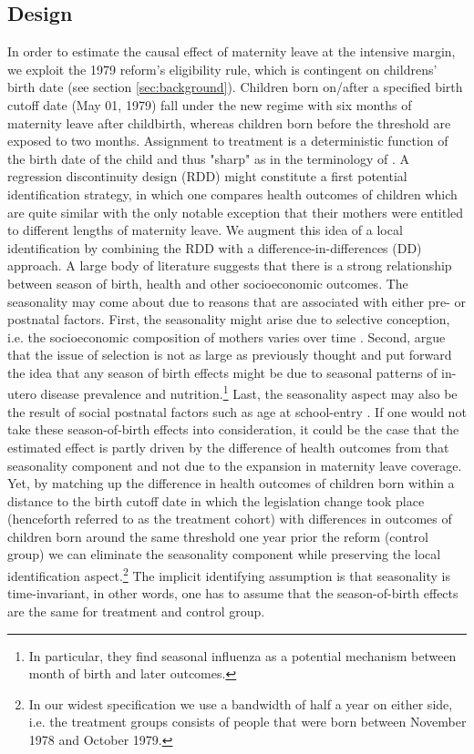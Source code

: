 \documentclass[11pt, a4paper]{article} %
\begin{document}
\subsection{Design}\label{sec:empirical_strategy_1design}
In order to estimate the causal effect of maternity leave at the intensive margin, we exploit the 1979 reform's eligibility rule, which is contingent on childrens' birth date (see section \ref{sec:background}). Children born on/after a specified birth cutoff date (May 01, 1979) fall under the new regime with six months of maternity leave after childbirth, whereas children born before the threshold are exposed to two months. Assignment to treatment is a deterministic function of the birth date of the child and thus "sharp" as in the terminology of \cite{hahn2001identification}. A regression discontinuity design (RDD) might constitute a first potential identification strategy, in which one compares health outcomes of children which are quite similar with the only notable exception that their mothers were entitled to different lengths of maternity leave.\newline 
We augment this idea of a local identification by combining the RDD with a difference-in-differences (DD) approach. A large body of literature suggests that there is a strong relationship between season of birth, health and other socioeconomic outcomes. The seasonality may come about due to reasons that are associated with either pre- or postnatal factors. First, the seasonality might arise due to selective conception, i.e. the socioeconomic composition of mothers varies over time \citep{buckles2013season}. Second, \cite{currie2013within} argue that the issue of selection is not as large as previously thought and put forward the idea that any season of birth effects might be due to seasonal patterns of in-utero disease prevalence and nutrition.\footnote{In particular, they find seasonal influenza as a potential mechanism between month of birth and later outcomes.} Last, the seasonality aspect may also be the result of social postnatal factors such as age at school-entry \citep{black2011too}. \newline If one would not take these season-of-birth effects into consideration, it could be the case that the estimated effect is partly driven by the difference of health outcomes from that seasonality component and not due to the expansion in maternity leave coverage. Yet, by matching up the difference in health outcomes of children born within a distance to the birth cutoff date in which the legislation change took place (henceforth referred to as the treatment cohort) with differences in outcomes of children born around the same threshold one year prior the reform (control group) we can eliminate the seasonality component while preserving the local identification aspect.\footnote{In our widest specification we use a bandwidth of half a year on either side, i.e. the treatment groups consists of people that were born between November 1978 and October 1979.}
The implicit identifying assumption is that seasonality is time-invariant, in other words, one has to assume that the season-of-birth effects are the same for treatment and control group.\newline
\end{document}
